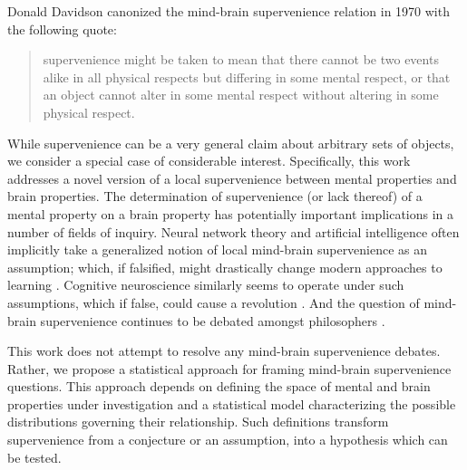 \documentclass{article}
\begin{document}

\newpage

\noindent Donald Davidson canonized the mind-brain supervenience relation in 1970 with the following quote: \cite{Davidson70}
\begin{quotation}
\noindent supervenience might be taken to mean that there cannot be two events alike in all physical respects but differing in some mental respect, or that an object cannot alter in some mental respect without altering in some physical respect.
\end{quotation}
While supervenience can be a very general claim about arbitrary sets of objects, we consider a special case of considerable interest.  Specifically, this work addresses a novel version of a local supervenience between mental properties and brain properties.  The determination of supervenience (or lack thereof) of a mental property on a brain property has potentially important implications in a number of fields of inquiry.  Neural network theory and artificial intelligence often implicitly take a generalized notion of local mind-brain supervenience as an assumption; which, if falsified, might drastically change modern approaches to learning \cite{Haykin2008}. Cognitive neuroscience similarly seems to operate under such assumptions, which if false, could cause a revolution \cite{Fodor1992, Gazzaniga2008}.  And the question of mind-brain supervenience continues to be debated amongst philosophers \cite{Kim2007}.

This work does not attempt to resolve any mind-brain supervenience debates.  Rather, we propose a statistical approach for framing mind-brain supervenience questions.  This approach depends on defining the space of mental and brain properties under investigation and a statistical model characterizing the possible distributions governing their relationship.  Such definitions transform supervenience from a conjecture or an assumption, into a hypothesis which can be tested.
\end{document}
